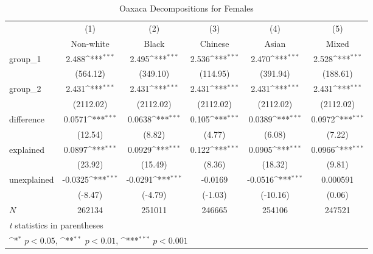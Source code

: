 \begin{table}[htbp]\centering
\def\sym#1{\ifmmode^{#1}\else\(^{#1}\)\fi}
\caption{Oaxaca Decompositions for Females\label{tab1}}
\begin{tabular}{l*{5}{c}}
\hline\hline
            &\multicolumn{1}{c}{(1)}&\multicolumn{1}{c}{(2)}&\multicolumn{1}{c}{(3)}&\multicolumn{1}{c}{(4)}&\multicolumn{1}{c}{(5)}\\
            &\multicolumn{1}{c}{Non-white}&\multicolumn{1}{c}{Black}&\multicolumn{1}{c}{Chinese}&\multicolumn{1}{c}{Asian}&\multicolumn{1}{c}{Mixed}\\
\hline
group\_1     &       2.488\sym{***}&       2.495\sym{***}&       2.536\sym{***}&       2.470\sym{***}&       2.528\sym{***}\\
            &    (564.12)         &    (349.10)         &    (114.95)         &    (391.94)         &    (188.61)         \\
group\_2     &       2.431\sym{***}&       2.431\sym{***}&       2.431\sym{***}&       2.431\sym{***}&       2.431\sym{***}\\
            &   (2112.02)         &   (2112.02)         &   (2112.02)         &   (2112.02)         &   (2112.02)         \\
difference  &      0.0571\sym{***}&      0.0638\sym{***}&       0.105\sym{***}&      0.0389\sym{***}&      0.0972\sym{***}\\
            &     (12.54)         &      (8.82)         &      (4.77)         &      (6.08)         &      (7.22)         \\
explained   &      0.0897\sym{***}&      0.0929\sym{***}&       0.122\sym{***}&      0.0905\sym{***}&      0.0966\sym{***}\\
            &     (23.92)         &     (15.49)         &      (8.36)         &     (18.32)         &      (9.81)         \\
unexplained &     -0.0325\sym{***}&     -0.0291\sym{***}&     -0.0169         &     -0.0516\sym{***}&    0.000591         \\
            &     (-8.47)         &     (-4.79)         &     (-1.03)         &    (-10.16)         &      (0.06)         \\
\hline
\(N\)       &      262134         &      251011         &      246665         &      254106         &      247521         \\
\hline\hline
\multicolumn{6}{l}{\footnotesize \textit{t} statistics in parentheses}\\
\multicolumn{6}{l}{\footnotesize \sym{*} \(p<0.05\), \sym{**} \(p<0.01\), \sym{***} \(p<0.001\)}\\
\end{tabular}
\label{tab:oaxaca_female_summary}
\end{table}
